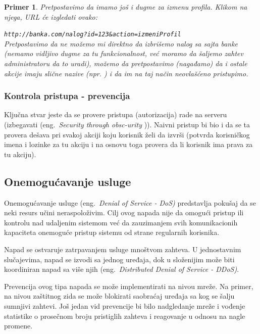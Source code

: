 \documentclass[a4paper]{article}
\newtheorem{primer}{Primer}[section]
\begin{document}
\begin{primer}
\label{primer4}
Pretpostavimo da imamo još i dugme za izmenu profila. Klikom na njega, URL će izgledati ovako:

\texttt{http://banka.com/nalog?id=123\&{}action=izmeniProfil}\\
Pretpostavimo da ne možemo mi direktno da izbrišemo nalog sa sajta banke (nemamo vidljivo dugme za tu funkcionalnost, već moramo da šaljemo zahtev administratoru da to uradi), možemo da pretpostavimo (nagađamo) da i ostale akcije imaju slične nazive (npr. ) i da im na taj način neovlašćeno pristupimo.\\
\end{primer}

\subsubsection{Kontrola pristupa - prevencija}

Ključna stvar jeste da se provere pristupa (autorizacija) rade na serveru (izbegavati (eng.~{\em Security through obsc-urity} \cite{AS})). Naivni pristup bi bio i da se ta provera dešava pri svakoj akciji koju korisnik želi da izvrši (potvrda korisničkog imena i lozinke za tu akciju i na osnovu toga provera da li korisnik ima prava za tu akciju).

\subsection{Onemogućavanje usluge}
Onemogućavanje usluge (eng.~{\em Denial of Service - DoS)} \cite{DoSM} predstavlja pokušaj da se neki resurs učini neraspoloživim. Cilj ovog napada nije da omogući pristup ili kontrolu nad udaljenim sistemom već da zauzimanjem svih komunikacionih kapaciteta onemoguće pristup sistemu od strane regularnih korisnika.

Napad se ostvaruje zatrpavanjem usluge mnoštvom zahteva. U jednostavnim slučajevima, napad se izvodi sa jednog uređaja, dok u složenijim može biti koordiniran napad sa više njih (eng.~{\em Distributed Denial of Service - DDoS)}.

Prevencija ovog tipa napada se može implementirati na nivou mreže. Na primer, na nivou zaštitnog zida se može blokirati saobraćaj uređaja sa kog se šalju sumnjivi zahtevi. Još jedan vid prevencije bi bilo nadgledanje mreže i vođenje statistike o prosečnom broju pristiglih zahteva i reagovanje u odnosu na nagle promene.
\end{document}
